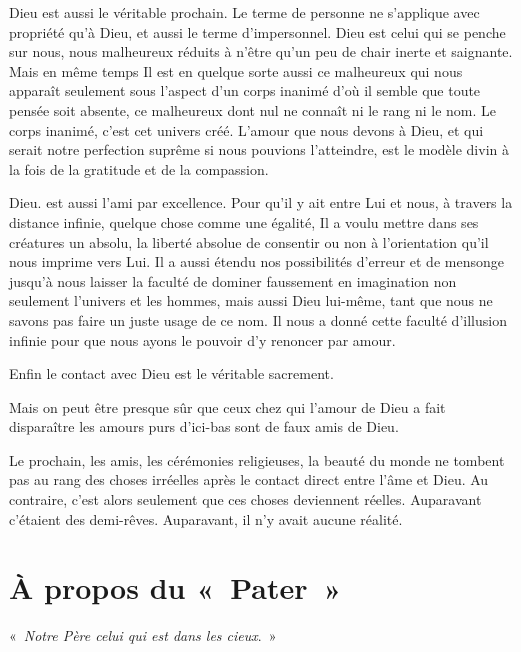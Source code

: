 \documentclass[french,twoside]{book} %
\newenvironment{quoteblock}%
  {\begin{quoting}}
  {\end{quoting}}
\newcommand\chapteropen{} %
\newcommand\chaptercont{} %
\newcommand\chapterclose{} %
\newenvironment{quotebar}{%
    \def\FrameCommand{{\color{rubric!10!}\vrule width 0.5em} \hspace{0.9em}}%
    \def\OuterFrameSep{\itemsep} %
    \MakeFramed {\advance\hsize-\width \FrameRestore}
  }%
  {%
    \endMakeFramed
  }
\renewenvironment{quoteblock}%
  {%
    \savenotes
    \setstretch{0.9}
    \normalfont
    \begin{quotebar}
  }
  {%
    \end{quotebar}
    \spewnotes
  }
\begin{document}
Dieu est aussi le véritable prochain. Le terme de personne ne s'applique avec propriété qu'à Dieu, et aussi le terme d'impersonnel. Dieu est celui qui se penche sur nous, nous malheureux réduits à n'être qu'un peu de chair inerte et saignante. Mais en même temps Il est en quelque sorte aussi ce malheureux qui nous apparaît seulement sous l'aspect d'un corps inanimé d'où il semble que toute pensée soit absente, ce malheureux dont nul ne connaît ni le rang ni le nom. Le corps inanimé, c'est cet univers créé. L'amour que nous devons à Dieu, et qui serait notre perfection suprême si nous pouvions l'atteindre, est le modèle divin à la fois de la gratitude et de la compassion.\par
Dieu. est aussi l'ami par excellence. Pour qu'il y ait entre Lui et nous, à travers la distance infinie, quelque chose comme une égalité, Il a voulu mettre dans ses créatures un absolu, la liberté absolue de consentir ou non à l'orientation qu'il nous imprime vers Lui. Il a aussi étendu nos possibilités d'erreur et de mensonge jusqu'à nous laisser la faculté de dominer faussement en imagination non seulement l'univers et les hommes, mais aussi Dieu lui-même, tant que nous ne savons pas faire un juste usage de ce nom. Il nous a donné cette faculté d'illusion infinie pour que nous ayons le pouvoir d'y renoncer par amour.\par
Enfin le contact avec Dieu est le véritable sacrement.\par
Mais on peut être presque sûr que ceux chez qui l'amour de Dieu a fait disparaître les amours purs d'ici-bas sont de faux amis de Dieu.\par
Le prochain, les amis, les cérémonies religieuses, la beauté du monde ne tombent pas au rang des choses irréelles après le contact direct entre l'âme et Dieu. Au contraire, c'est alors seulement que ces choses deviennent réelles. Auparavant c'étaient des demi-rêves. Auparavant, il n'y avait aucune réalité.\par

\begin{center}
\end{center}
\chapterclose


\chapteropen
\chapter[À propos du « Pater »]{À propos du « Pater »}

\chaptercont

\begin{quoteblock}
  « {\itshape Notre Père celui qui est dans les cieux}. »
 \end{quoteblock}
\end{document}
